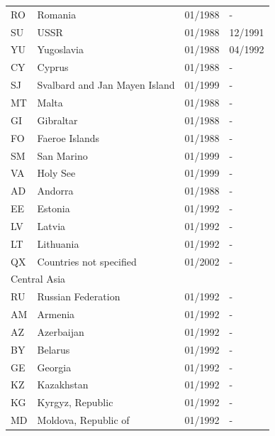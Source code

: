 \begin{footnotesize}
\begin{longtable}{p{0.5cm}p{9cm}p{2cm}p{2cm}}
RO	&	Romania	&	01/1988	&	-	\\

SU	&	USSR	&	01/1988	&	12/1991	\\

YU	&	Yugoslavia	&	01/1988	&	04/1992	\\

CY	&	Cyprus	&	01/1988	&	-	\\

SJ	&	Svalbard and Jan Mayen Island	&	01/1999	&	-	\\

MT	&	Malta	&	01/1988	&	-	\\

GI	&	Gibraltar	&	01/1988	&	-	\\

FO	&	Faeroe Islands	&	01/1988	&	-	\\

SM	&	San Marino	&	01/1999	&	-	\\

VA	&	Holy See	&	01/1999	&	-	\\

AD	&	Andorra	&	01/1988	&	-	\\

EE	&	Estonia	&	01/1992	&	-	\\

LV	&	Latvia	&	01/1992	&	-	\\

LT	&	Lithuania	&	01/1992	&	-	\\
QX	&	Countries not specified	&	01/2002	&	-	\\
\midrule
\multicolumn{3}{l}{Central Asia}	&	\\
RU	&	Russian Federation	&	01/1992	&	-	\\

AM	&	Armenia	&	01/1992	&	-	\\

AZ	&	Azerbaijan	&	01/1992	&	-	\\

BY	&	Belarus	&	01/1992	&	-	\\

GE	&	Georgia	&	01/1992	&	-	\\

KZ	&	Kazakhstan	&	01/1992	&	-	\\

KG	&	Kyrgyz, Republic	&	01/1992	&	-	\\

MD	&	Moldova, Republic of	&	01/1992	&	-	\\


\end{longtable}
\end{footnotesize}

